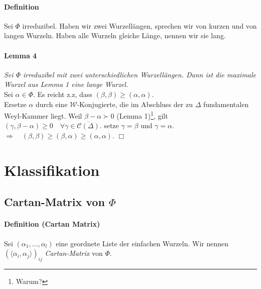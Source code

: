 \documentclass[a4paper,12pt]{article}
\begin{document}
\paragraph{Definition} Sei $\Phi$ irreduzibel. Haben wir zwei Wurzellängen, sprechen wir von kurzen und von langen Wurzeln. Haben alle Wurzeln gleiche Länge, nennen wir sie lang.

\paragraph{Lemma 4} \emph{Sei $\Phi$ irreduzibel mit zwei unterschiedlichen Wurzellängen. Dann ist die maximale Wurzel aus Lemma 1 eine lange Wurzel.}\\
Sei $\alpha\in\Phi$. Es reicht z.z, dass $(\beta,\beta) \geq (\alpha,\alpha)$.\\
Ersetze $\alpha$ durch eine $\mathcal{W}$-Konjugierte, die im Abschluss der zu $\Delta$ fundamentalen Weyl-Kammer liegt. Weil $\beta-\alpha \succ 0$ (Lemma 1)\footnote{Warum?}, gilt $(\gamma, \beta-\alpha) \geq 0\quad \forall \gamma \in \overline{\mathcal{C}(\Delta)}$. setze $\gamma = \beta$ und $\gamma = \alpha$.\\
$\Rightarrow\quad (\beta, \beta) \geq (\beta,\alpha)\geq (\alpha,\alpha)$.
\hfill$\Box$ 

\section{Klassifikation}
\subsection{Cartan-Matrix von $\Phi$}
\paragraph{Definition (Cartan Matrix)} Sei $(\alpha_1 , \ldots , \alpha_l)$ eine geordnete Liste der einfachen Wurzeln. Wir nennen $(\langle \alpha_i , \alpha_j \rangle)_{ij}$ \emph{Cartan-Matrix} von $\Phi$.
\end{document}

